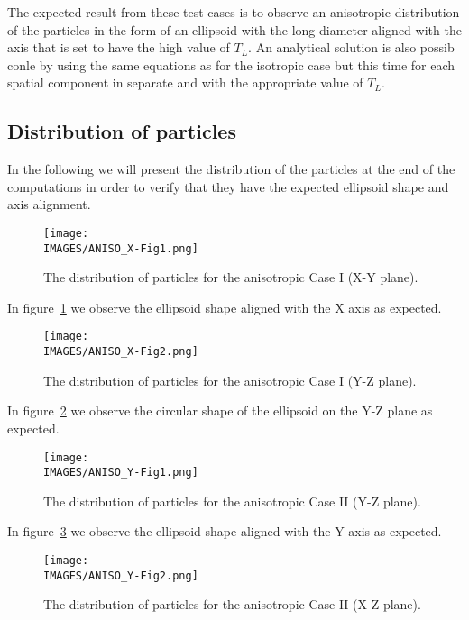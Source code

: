 The expected result from these test cases is to observe an anisotropic distribution of the particles in the form of an ellipsoid with the long diameter aligned with the axis that is set to have the high value of $T_L$. An analytical solution is also possib conle by using the same equations as for the isotropic case but this time for each spatial component in separate and with the appropriate value of $T_L$.

\subsection{Distribution of particles}
In the following we will present the distribution of the particles at the end of the computations in order to verify that they have the expected ellipsoid shape and axis alignment.

\begin{figure}[H]
    \centering
    \texttt{[image: \\IMAGES/ANISO\_X-Fig1.png]}
    \caption{The distribution of particles for the anisotropic Case I (X-Y plane).}
    \label{Fig_ANISO_X_Fig1}
\end{figure}

In figure~\ref{Fig_ANISO_X_Fig1} we observe the ellipsoid shape aligned with the X axis as expected.

\begin{figure}[H]
    \centering
    \texttt{[image: \\IMAGES/ANISO\_X-Fig2.png]}
    \caption{The distribution of particles for the anisotropic Case I (Y-Z plane).}
    \label{Fig_ANISO_X_Fig2}
\end{figure}

In figure~\ref{Fig_ANISO_X_Fig2} we observe the circular shape of the ellipsoid on the Y-Z plane as expected.

\begin{figure}[H]
    \centering
    \texttt{[image: \\IMAGES/ANISO\_Y-Fig1.png]}
    \caption{The distribution of particles for the anisotropic Case II (Y-Z plane).}
    \label{Fig_ANISO_Y_Fig1}
\end{figure}

In figure~\ref{Fig_ANISO_Y_Fig1} we observe the ellipsoid shape aligned with the Y axis as expected.

\begin{figure}[H]
    \centering
    \texttt{[image: \\IMAGES/ANISO\_Y-Fig2.png]}
    \caption{The distribution of particles for the anisotropic Case II (X-Z plane).}
    \label{Fig_ANISO_Y_Fig2}
\end{figure}

